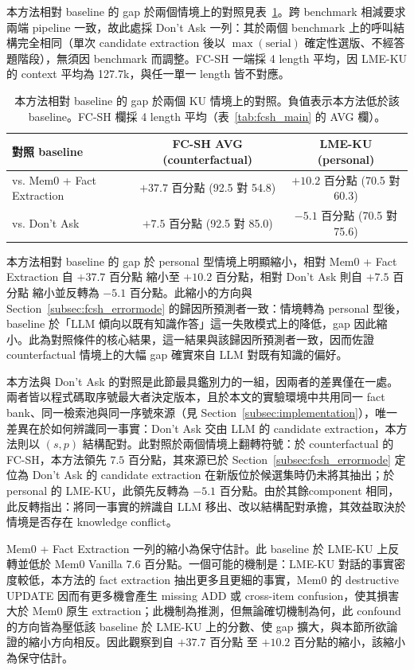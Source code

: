  
本方法相對 baseline 的 gap 於兩個情境上的對照見表~\ref{tab:lme_gap}。跨 benchmark 相減要求兩端 pipeline 一致，故此處採 Don't Ask 一列：其於兩個 benchmark 上的呼叫結構完全相同（單次 candidate extraction 後以 $\max(\text{serial})$ 確定性選版、不經答題階段），無須因 benchmark 而調整。FC-SH 一端採 4 length 平均，因 LME-KU 的 context 平均為 127.7k，與任一單一 length 皆不對應。
 
 
\begin{table}[!htb]
\centering
\caption{本方法相對 baseline 的 gap 於兩個 KU 情境上的對照。負值表示本方法低於該 baseline。FC-SH 欄採 4 length 平均（表~\ref{tab:fcsh_main} 的 AVG 欄）。}
\label{tab:lme_gap}
\small
\begin{tabular}{lcc}
\toprule
對照 baseline & FC-SH AVG (counterfactual) & LME-KU (personal) \\
\midrule
vs. Mem0 + Fact Extraction & $+37.7$ 百分點 (92.5 對 54.8) & $+10.2$ 百分點 (70.5 對 60.3) \\
vs. Don't Ask & $+7.5$ 百分點 (92.5 對 85.0) & $-5.1$ 百分點 (70.5 對 75.6) \\
\bottomrule
\end{tabular}
\end{table}
 
本方法相對 baseline 的 gap 於 personal 型情境上明顯縮小，相對 Mem0 + Fact Extraction 自 $+37.7$ 百分點 縮小至 $+10.2$ 百分點，相對 Don't Ask 則自 $+7.5$ 百分點 縮小並反轉為 $-5.1$ 百分點。此縮小的方向與 Section~\ref{subsec:fcsh_errormode} 的歸因所預測者一致：情境轉為 personal 型後，baseline 於「LLM 傾向以既有知識作答」這一失敗模式上的降低，gap 因此縮小。此為對照條件的核心結果，這一結果與該歸因所預測者一致，因而佐證 counterfactual 情境上的大幅 gap 確實來自 LLM 對既有知識的偏好。
 
本方法與 Don't Ask 的對照是此節最具鑑別力的一組，因兩者的差異僅在一處。兩者皆以程式碼取序號最大者決定版本，且於本文的實驗環境中共用同一 fact bank、同一檢索池與同一序號來源（見 Section~\ref{subsec:implementation}），唯一差異在於如何辨識同一事實：Don't Ask 交由 LLM 的 candidate extraction，本方法則以 $(s, p)$ 結構配對。此對照於兩個情境上翻轉符號：於 counterfactual 的 FC-SH，本方法領先 $7.5$ 百分點，其來源已於 Section~\ref{subsec:fcsh_errormode} 定位為 Don't Ask 的 candidate extraction 在新版位於候選集時仍未將其抽出；於 personal 的 LME-KU，此領先反轉為 $-5.1$ 百分點。由於其餘component 相同，此反轉指出：將同一事實的辨識自 LLM 移出、改以結構配對承擔，其效益取決於情境是否存在 knowledge conflict。
 
Mem0 + Fact Extraction 一列的縮小為保守估計。此 baseline 於 LME-KU 上反轉並低於 Mem0 Vanilla 7.6 百分點。一個可能的機制是：LME-KU 對話的事實密度較低，本方法的 fact extraction 抽出更多且更細的事實，Mem0 的 destructive UPDATE 因而有更多機會產生 missing ADD 或 cross-item confusion，使其損害大於 Mem0 原生 extraction；此機制為推測，但無論確切機制為何，此 confound 的方向皆為壓低該 baseline 於 LME-KU 上的分數、使 gap 擴大，與本節所欲論證的縮小方向相反。因此觀察到自 $+37.7$ 百分點 至 $+10.2$ 百分點的縮小，該縮小為保守估計。
 
